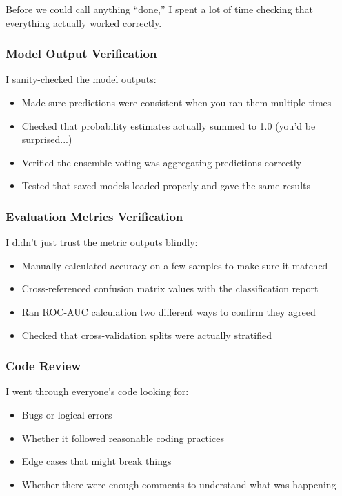 \documentclass[12pt]{article}
\begin{document}
Before we could call anything ``done,'' I spent a lot of time checking that everything actually worked correctly.

\subsubsection{Model Output Verification}
I sanity-checked the model outputs:
\begin{itemize}
    \item Made sure predictions were consistent when you ran them multiple times
    \item Checked that probability estimates actually summed to 1.0 (you'd be surprised...)
    \item Verified the ensemble voting was aggregating predictions correctly
    \item Tested that saved models loaded properly and gave the same results
\end{itemize}

\subsubsection{Evaluation Metrics Verification}
I didn't just trust the metric outputs blindly:
\begin{itemize}
    \item Manually calculated accuracy on a few samples to make sure it matched
    \item Cross-referenced confusion matrix values with the classification report
    \item Ran ROC-AUC calculation two different ways to confirm they agreed
    \item Checked that cross-validation splits were actually stratified
\end{itemize}

\subsubsection{Code Review}
I went through everyone's code looking for:
\begin{itemize}
    \item Bugs or logical errors
    \item Whether it followed reasonable coding practices
    \item Edge cases that might break things
    \item Whether there were enough comments to understand what was happening
\end{itemize}
\end{document}
